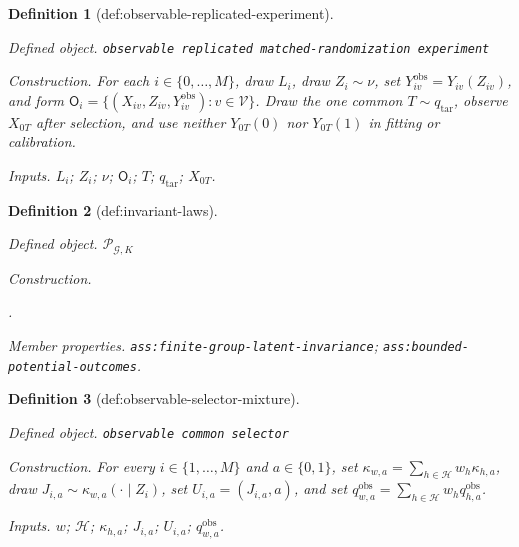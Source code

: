 \documentclass{article}
\newtheorem{definition}{Definition}
\begin{document}
\begin{definition}[def:observable-replicated-experiment]\label{def:observable-replicated-experiment}
\par\smallskip\noindent\emph{Defined object.} \texttt{observable replicated matched-\allowbreak{}randomization experiment}
\par\smallskip\noindent\emph{Construction.} For each \(i\in\{0,\ldots,M\}\), draw \(L_i\), draw \(Z_i\sim\nu\), set \(Y^{\mathrm{obs}}_{iv}=Y_{iv}(Z_{iv})\), and form \(\mathsf O_i=\{(X_{iv},Z_{iv},Y^{\mathrm{obs}}_{iv}):v\in\mathcal V\}\). Draw the one common \(T\sim q_{\mathrm{tar}}\), observe \(X_{0T}\) after selection, and use neither \(Y_{0T}(0)\) nor \(Y_{0T}(1)\) in fitting or calibration.
\par\smallskip\noindent\emph{Inputs.} \(L_i\); \(Z_i\); \(\nu\); \(\mathsf O_i\); \(T\); \(q_{\mathrm{tar}}\); \(X_{0T}\).
\end{definition}

\begin{definition}[def:invariant-laws]\label{def:invariant-laws}
\par\smallskip\noindent\emph{Defined object.} \(\mathcal P_{\mathcal G,K}\)
\par\smallskip\noindent\emph{Construction.} \par\noindent {}\par\noindent.
\par\smallskip\noindent\emph{Member properties.} \texttt{ass:\allowbreak{}finite-\allowbreak{}group-\allowbreak{}latent-\allowbreak{}invariance}; \texttt{ass:\allowbreak{}bounded-\allowbreak{}potential-\allowbreak{}outcomes}.
\end{definition}

\begin{definition}[def:observable-selector-mixture]\label{def:observable-selector-mixture}
\par\smallskip\noindent\emph{Defined object.} \texttt{observable common selector}
\par\smallskip\noindent\emph{Construction.} For every \(i\in\{1,\ldots,M\}\) and \(a\in\{0,1\}\), set \(\kappa_{w,a}=\sum_{h\in\mathcal H}w_h\kappa_{h,a}\), draw \(J_{i,a}\sim\kappa_{w,a}(\cdot\mid Z_i)\), set \(U_{i,a}=(J_{i,a},a)\), and set \(q^{\mathrm{obs}}_{w,a}=\sum_{h\in\mathcal H}w_hq^{\mathrm{obs}}_{h,a}\).
\par\smallskip\noindent\emph{Inputs.} \(w\); \(\mathcal H\); \(\kappa_{h,a}\); \(J_{i,a}\); \(U_{i,a}\); \(q^{\mathrm{obs}}_{w,a}\).
\end{definition}
\end{document}
